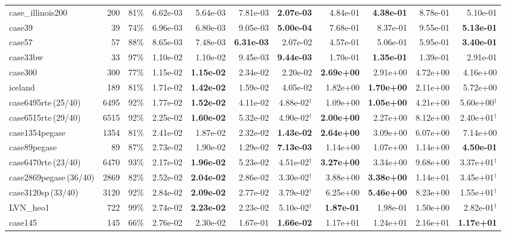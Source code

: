 \documentclass[10pt]{article}
\begin{document}
\begin{landscape}
\begin{table}[H]
\begin{tabular}{lrr rrrr rrrr}
case\_illinois200 & 200 & 81\% & 6.62e-03 & 5.64e-03 & 7.81e-03 & \textbf{2.07e-03} & 4.84e-01 & \textbf{4.38e-01} & 8.78e-01 & 5.10e-01 \\
case39 & 39 & 74\% & 6.96e-03 & 6.80e-03 & 9.05e-03 & \textbf{5.00e-04} & 7.68e-01 & 8.37e-01 & 9.55e-01 & \textbf{5.13e-01} \\
case57 & 57 & 88\% & 8.65e-03 & 7.48e-03 & \textbf{6.31e-03} & 2.07e-02 & 4.57e-01 & 5.06e-01 & 5.95e-01 & \textbf{3.40e-01} \\
case33bw & 33 & 97\% & 1.10e-02 & 1.10e-02 & 9.45e-03 & \textbf{9.44e-03} & 1.70e-01 & \textbf{1.35e-01} & 1.39e-01 & 2.91e-01 \\
case300 & 300 & 77\% & 1.15e-02 & \textbf{1.15e-02} & 2.34e-02 & 2.20e-02 & \textbf{2.69e+00} & 2.91e+00 & 4.72e+00 & 4.16e+00 \\
iceland & 189 & 81\% & 1.71e-02 & \textbf{1.42e-02} & 1.59e-02 & 4.05e-02 & 1.82e+00 & \textbf{1.70e+00} & 2.11e+00 & 5.72e+00 \\
case6495rte\,(25/40) & 6495 & 92\% & 1.77e-02 & \textbf{1.52e-02} & 4.11e-02 & 4.88e-02$^\dagger$ & 1.09e+00 & \textbf{1.05e+00} & 4.21e+00 & 5.60e+00$^\dagger$ \\
case6515rte\,(29/40) & 6515 & 92\% & 2.25e-02 & \textbf{1.60e-02} & 5.32e-02 & 4.90e-02$^\dagger$ & \textbf{2.00e+00} & 2.27e+00 & 8.12e+00 & 2.40e+01$^\dagger$ \\
case1354pegase & 1354 & 81\% & 2.41e-02 & 1.87e-02 & 2.32e-02 & \textbf{1.43e-02} & \textbf{2.64e+00} & 3.09e+00 & 6.07e+00 & 7.14e+00 \\
case89pegase & 89 & 87\% & 2.73e-02 & 1.90e-02 & 1.29e-02 & \textbf{7.13e-03} & 1.14e+00 & 1.07e+00 & 1.14e+00 & \textbf{4.50e-01} \\
case6470rte\,(23/40) & 6470 & 93\% & 2.17e-02 & \textbf{1.96e-02} & 5.23e-02 & 4.51e-02$^\dagger$ & \textbf{3.27e+00} & 3.34e+00 & 9.68e+00 & 3.37e+01$^\dagger$ \\
case2869pegase\,(36/40) & 2869 & 82\% & 2.52e-02 & \textbf{2.04e-02} & 2.86e-02 & 3.30e-02$^\dagger$ & 3.88e+00 & \textbf{3.38e+00} & 1.14e+01 & 3.45e+01$^\dagger$ \\
case3120sp\,(33/40) & 3120 & 92\% & 2.84e-02 & \textbf{2.09e-02} & 2.77e-02 & 3.79e-02$^\dagger$ & 6.25e+00 & \textbf{5.46e+00} & 8.23e+00 & 1.55e+01$^\dagger$ \\
LVN\_heo1 & 722 & 99\% & 2.74e-02 & \textbf{2.23e-02} & 2.23e-02 & 5.10e-02$^\dagger$ & \textbf{1.87e-01} & 1.98e-01 & 1.50e+00 & 2.82e-01$^\dagger$ \\
case145 & 145 & 66\% & 2.76e-02 & 2.30e-02 & 1.67e-01 & \textbf{1.66e-02} & 1.17e+01 & 1.24e+01 & 2.16e+01 & \textbf{1.17e+01} \\

\end{tabular}
\end{table}
\end{landscape}
\end{document}

